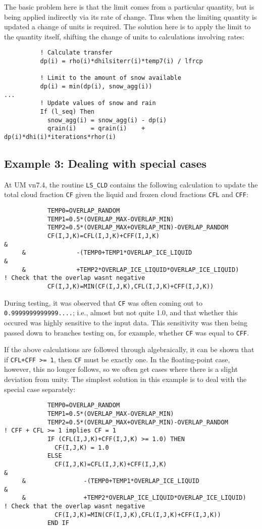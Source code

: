 The basic problem here is that the limit comes from a 
particular quantity, but is being applied indirectly via its rate of change. 
Thus when the limiting quantity is updated a change of units is required. 
The solution here is to apply the limit to the quantity itself, 
shifting the change of units to calculations involving rates:
\begin{verbatim}
          ! Calculate transfer
          dp(i) = rho(i)*dhilsiterr(i)*temp7(i) / lfrcp

          ! Limit to the amount of snow available
          dp(i) = min(dp(i), snow_agg(i))
...
          ! Update values of snow and rain
          If (l_seq) Then
            snow_agg(i) = snow_agg(i) - dp(i)
            qrain(i)    = qrain(i)    + dp(i)*dhi(i)*iterations*rhor(i)
\end{verbatim}
\subsection{Example 3: Dealing with special cases}
At UM vn7.4, the routine \verb|LS_CLD| 
contains the following calculation to update the total cloud fraction 
\verb|CF| given the liquid and frozen cloud fractions \verb|CFL| and 
\verb|CFF|:
\begin{verbatim}
            TEMP0=OVERLAP_RANDOM
            TEMP1=0.5*(OVERLAP_MAX-OVERLAP_MIN)
            TEMP2=0.5*(OVERLAP_MAX+OVERLAP_MIN)-OVERLAP_RANDOM
            CF(I,J,K)=CFL(I,J,K)+CFF(I,J,K)                             &
     &              -(TEMP0+TEMP1*OVERLAP_ICE_LIQUID                    &
     &              +TEMP2*OVERLAP_ICE_LIQUID*OVERLAP_ICE_LIQUID)
! Check that the overlap wasnt negative
            CF(I,J,K)=MIN(CF(I,J,K),CFL(I,J,K)+CFF(I,J,K))
\end{verbatim}
During testing, it was observed that \verb|CF| was often coming out to 
\verb|0.9999999999999....|; i.e., 
almost but not quite 1.0, and that whether this occured 
was highly sensitive to the input data. 
This sensitivity was then being passed down to branches testing on, 
for example, whether \verb|CF| was equal to \verb|CFF|.

If the above calculations are followed through algebraically, 
it can be shown that if \verb|CFL+CFF >= 1|, then \verb|CF| 
must be exactly one. In the floating-point case, 
however, this no longer follows, so we often get cases 
where there is a slight deviation from unity. 
The simplest solution in this example is to deal with 
the special case separately:
\begin{verbatim}
            TEMP0=OVERLAP_RANDOM
            TEMP1=0.5*(OVERLAP_MAX-OVERLAP_MIN)
            TEMP2=0.5*(OVERLAP_MAX+OVERLAP_MIN)-OVERLAP_RANDOM
! CFF + CFL >= 1 implies CF = 1
            IF (CFL(I,J,K)+CFF(I,J,K) >= 1.0) THEN
              CF(I,J,K) = 1.0
            ELSE
              CF(I,J,K)=CFL(I,J,K)+CFF(I,J,K)                             &
     &                -(TEMP0+TEMP1*OVERLAP_ICE_LIQUID                    &
     &                +TEMP2*OVERLAP_ICE_LIQUID*OVERLAP_ICE_LIQUID)
! Check that the overlap wasnt negative
              CF(I,J,K)=MIN(CF(I,J,K),CFL(I,J,K)+CFF(I,J,K))
            END IF
\end{verbatim}
